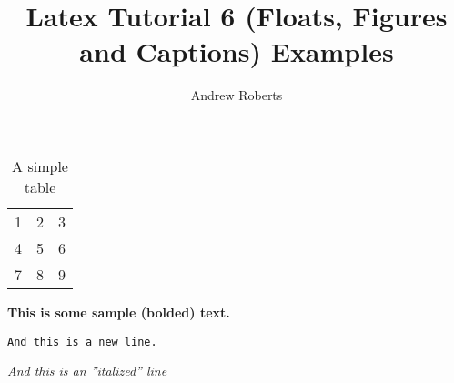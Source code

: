 \documentclass[english]{article}
\begin{document}
\title{Latex Tutorial 6 (Floats, Figures and Captions) Examples}
\author{Andrew Roberts}
\maketitle

\begin{table}[htp]
  \begin{center}
    \begin{tabular}{| l c r |}
    \hline
    1 & 2 & 3 \\
    4 & 5 & 6 \\
    7 & 8 & 9 \\
    \hline
    \end{tabular}
  \end{center}
  \caption{A simple table}
\end{table}

\textbf{This is some sample (bolded) text.}

\texttt{And this is a new line.}

\textit{And this is an ''italized'' line}
\end{document}
